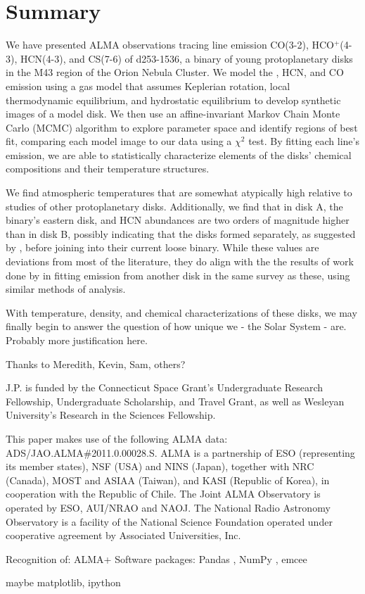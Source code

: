 \chapter{Summary}
\label{chap:Summary}


We have presented ALMA observations tracing line emission CO(3-2), HCO$^+$(4-3), HCN(4-3), and CS(7-6) of d253-1536, a binary of young protoplanetary disks in the M43 region of the Orion Nebula Cluster. We model the \hco, HCN, and CO emission using a gas model that assumes Keplerian rotation, local thermodynamic equilibrium, and hydrostatic equilibrium to develop synthetic images of a model disk. We then use an affine-invariant Markov Chain Monte Carlo (MCMC) algorithm to explore parameter space and identify regions of best fit, comparing each model image to our data using a $\chi^2$ test. By fitting each line's emission, we are able to statistically characterize elements of the disks' chemical compositions and their temperature structures.

We find atmospheric temperatures that are somewhat atypically high relative to studies of other protoplanetary disks. Additionally, we find that in disk A, the binary's eastern disk, \hco and HCN abundances are two orders of magnitude higher than in disk B, possibly indicating that the disks formed separately, as suggested by \cite{Williams2014}, before joining into their current loose binary. While these values are deviations from most of the literature, they do align with the the results of work done by \citet{Factor2017} in fitting \hco emission from another disk in the same survey as these, using similar methods of analysis.

With temperature, density, and chemical characterizations of these disks, we may finally begin to answer the question of how unique we - the Solar System - are. Probably more justification here.




Thanks to Meredith, Kevin, Sam, others?

J.P. is funded by the Connecticut Space Grant's Undergraduate Research Fellowship, Undergraduate Scholarship, and Travel Grant, as well as Wesleyan University’s Research in the Sciences Fellowship.

This paper makes use of the following ALMA data: ADS/JAO.ALMA\#2011.0.00028.S. ALMA is a partnership of ESO (representing its member states), NSF (USA) and NINS (Japan), together with NRC (Canada), MOST and ASIAA (Taiwan), and KASI (Republic of Korea), in cooperation with the Republic of Chile. The Joint ALMA Observatory is operated by ESO, AUI/NRAO and NAOJ. The National Radio Astronomy Observatory is a facility of the National Science Foundation operated under cooperative agreement by Associated Universities, Inc.

Recognition of: ALMA+
Software packages: Pandas \citep{McKinney2010,McKinney2011}, NumPy \citep{VanDerWalt2011}, emcee \citep{ForemanMackey2013}

maybe matplotlib, ipython
